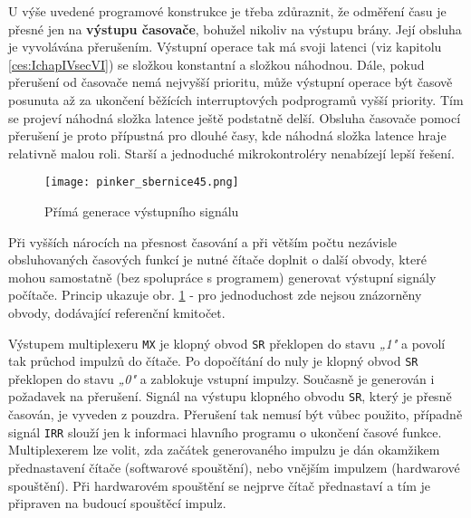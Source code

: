         U výše uvedené programové konstrukce je třeba zdůraznit, že odměření času je přesné jen na 
        \textbf{výstupu časovače}, bohužel nikoliv na výstupu brány. Její obsluha je vyvolávána 
        přerušením. Výstupní operace tak má svoji latenci (viz kapitolu \ref{ces:IchapIVsecVI}) se 
        složkou konstantní a složkou náhodnou. Dále, pokud přerušení od časovače nemá nejvyšší 
        prioritu, může výstupní operace být časově posunuta až za ukončení běžících interruptových 
        podprogramů vyšší priority. Tím se projeví náhodná složka latence ještě podstatně delší. 
        Obsluha časovače pomocí přerušení je proto přípustná pro dlouhé časy, kde náhodná složka 
        latence hraje relativně malou roli. Starší a jednoduché mikrokontroléry nenabízejí lepší 
        řešení.
        
        \begin{figure}[ht!] %
          \centering
          \texttt{[image: pinker\_sbernice45.png]}
          \caption{Přímá generace výstupního signálu}
          \label{MIT:fig_sbernice45}
        \end{figure}
        
        Při vyšších nárocích na přesnost časování a při větším počtu nezávisle obsluhovaných 
        časových funkcí je nutné čítače doplnit o další obvody, které mohou samostatně (bez 
        spolupráce s programem) generovat výstupní signály počítače. Princip ukazuje obr. 
        \ref{MIT:fig_sbernice45} - pro jednoduchost zde nejsou znázorněny obvody, dodávající 
        referenční kmitočet.
        
        Výstupem multiplexeru \texttt{MX} je klopný obvod \texttt{SR} překlopen do stavu \emph{„1"} 
        a povolí tak průchod impulzů do čítače. Po dopočítání do nuly je klopný obvod \texttt{SR} 
        překlopen do stavu \emph{„0"} a zablokuje vstupní impulzy. Současně je generován i 
        požadavek na přerušení. Signál na výstupu klopného obvodu \texttt{SR}, který je přesně 
        časován, je vyveden z pouzdra. Přerušení tak nemusí být vůbec použito, případně signál 
        \texttt{IRR} slouží jen k informaci hlavního programu o  ukončení časové funkce. 
        Multiplexerem lze volit, zda začátek generovaného impulzu je dán okamžikem přednastavení 
        čítače (softwarové spouštění), nebo vnějším impulzem (hardwarové spouštění). Při 
        hardwarovém spouštění se nejprve čítač přednastaví a tím je připraven na budoucí spouštěcí impulz.
        
